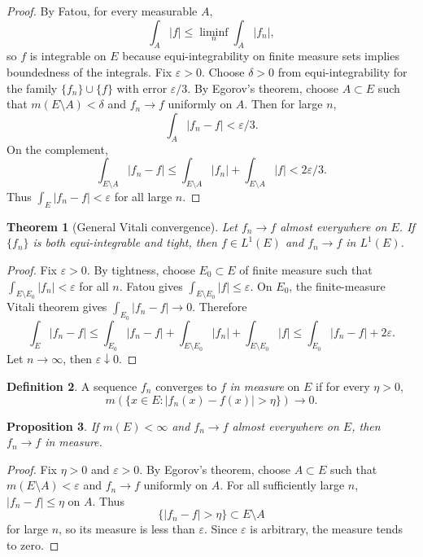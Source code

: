 \documentclass[11pt,openany]{book}
\numberwithin{equation}{chapter}
\theoremstyle{definition}
\newtheorem{definition}{Definition}[chapter]
\theoremstyle{plain}
\newtheorem{theorem}[definition]{Theorem}
\newtheorem{proposition}[definition]{Proposition}
\theoremstyle{remark}
\newcommand{\eps}{\varepsilon}
\newcommand{\1}{\mathbf{1}}
\newcommand{\abs}[1]{\left\lvert #1\right\rvert}
\begin{document}
\begin{proof}
By Fatou, for every measurable \(A\),
\[
    \int_A\abs f\le\liminf_n\int_A\abs{f_n},
\]
so \(f\) is integrable on \(E\) because equi-integrability on finite measure sets implies boundedness of the integrals.  Fix \(\eps>0\).  Choose \(\delta>0\) from equi-integrability for the family \(\{f_n\}\cup\{f\}\) with error \(\eps/3\).  By Egorov's theorem, choose \(A\subset E\) such that \(m(E\setminus A)<\delta\) and \(f_n\to f\) uniformly on \(A\).  Then for large \(n\),
\[
    \int_A\abs{f_n-f}<\eps/3.
\]
On the complement,
\[
    \int_{E\setminus A}\abs{f_n-f}
    \le\int_{E\setminus A}\abs{f_n}+\int_{E\setminus A}\abs f<2\eps/3.
\]
Thus \(\int_E\abs{f_n-f}<\eps\) for all large \(n\).
\end{proof}

\begin{theorem}[General Vitali convergence]
Let \(f_n\to f\) almost everywhere on \(E\).  If \(\{f_n\}\) is both equi-integrable and tight, then \(f\in L^1(E)\) and \(f_n\to f\) in \(L^1(E)\).
\end{theorem}

\begin{proof}
Fix \(\eps>0\).  By tightness, choose \(E_0\subset E\) of finite measure such that \(\int_{E\setminus E_0}\abs{f_n}<\eps\) for all \(n\).  Fatou gives \(\int_{E\setminus E_0}\abs f\le\eps\).  On \(E_0\), the finite-measure Vitali theorem gives \(\int_{E_0}\abs{f_n-f}\to0\).  Therefore
\[
    \int_E\abs{f_n-f}
    \le \int_{E_0}\abs{f_n-f}+\int_{E\setminus E_0}\abs{f_n}+\int_{E\setminus E_0}\abs f
    \le \int_{E_0}\abs{f_n-f}+2\eps.
\]
Let \(n\to\infty\), then \(\eps\downarrow0\).
\end{proof}

\begin{definition}
A sequence \(f_n\) converges to \(f\) \emph{in measure} on \(E\) if for every \(\eta>0\),
\[
    m(\{x\in E:\abs{f_n(x)-f(x)}>\eta\})\to0.
\]
\end{definition}

\begin{proposition}
If \(m(E)<\infty\) and \(f_n\to f\) almost everywhere on \(E\), then \(f_n\to f\) in measure.
\end{proposition}

\begin{proof}
Fix \(\eta>0\) and \(\eps>0\).  By Egorov's theorem, choose \(A\subset E\) such that \(m(E\setminus A)<\eps\) and \(f_n\to f\) uniformly on \(A\).  For all sufficiently large \(n\), \(\abs{f_n-f}\le\eta\) on \(A\).  Thus
\[
    \{\abs{f_n-f}>\eta\}\subset E\setminus A
\]
for large \(n\), so its measure is less than \(\eps\).  Since \(\eps\) is arbitrary, the measure tends to zero.
\end{proof}
\end{document}
